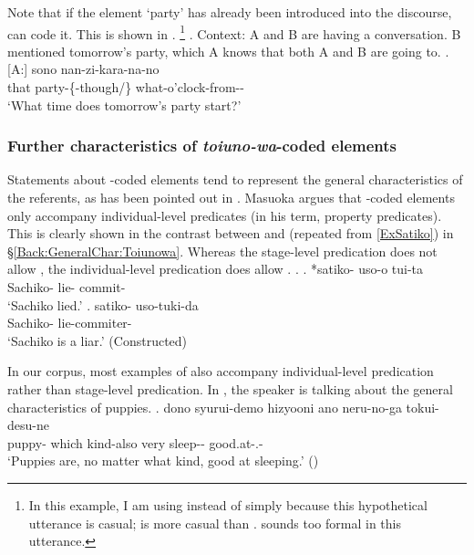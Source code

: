 Note that if the element `party' has already been introduced into the discourse,  can code it.
This is shown in \Next[A].%
	\footnote{
	In this example, I am using  instead of 
	simply because this hypothetical utterance is casual;
	 is more casual than .
	 sounds too formal in this utterance.
	}
\ex. \label{Party}Context: A and B are having a conversation. B mentioned tomorrow's party, which A knows that both A and B are going to.
	\ag.[A:] sono  nan-zi-kara-na-no \\
		that party-\{-though/\} what-o'clock-from-- \\
		`What time does tomorrow's party start?' 


\subsubsection{Further characteristics of \textit{toiuno-wa}-coded elements}\label{Par:Topic:Toiunowa:Other}

Statements about -coded elements tend to represent the general characteristics of the referents,
as has been pointed out in .
Masuoka argues that -coded elements only accompany individual-level predicates (in his term, property predicates).
This is clearly shown in the contrast between \Next[a] and \Next[b] (repeated from \ref{ExSatiko}) in \S \ref{Back:GeneralChar:Toiunowa}.
Whereas the stage-level predication \Next[a] does not allow ,
the individual-level predication \Next[b] does allow .
%
\ex.
\ag. *satiko- uso-o tui-ta \\
     Sachiko- lie- commit- \\
     `Sachiko lied.'
     \hfill{\cite[96]{masuoka12}}
\bg. satiko- uso-tuki-da \\
     Sachiko- lie-commiter- \\
     `Sachiko is a liar.'
     \hfill{(Constructed)}

In our corpus,
most examples of  also accompany individual-level predication
rather than stage-level predication.
In \Next,
the speaker is talking about the general characteristics of puppies.
%
\exg.  dono syurui-demo hizyooni ano neru-no-ga tokui-desu-ne \\
 puppy- which kind-also very  sleep-- good.at-.- \\
 `Puppies are, no matter what kind, good at sleeping.'
 \hfill{()}

